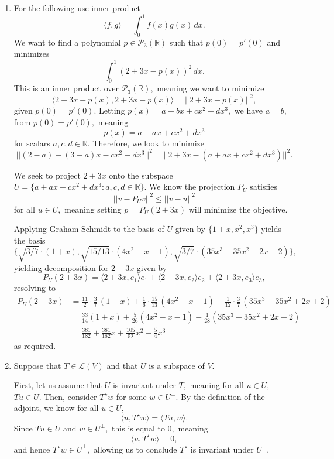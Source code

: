 \documentclass[12pt]{article}
\begin{document}
\begin{enumerate}
  \item For the following use inner product $$\langle f, g \rangle =
    \int_{0}^1 f(x) g(x) \, dx.$$ We want to find a polynomial $p \in
    \mathcal P_3(\mathbb R)$ such that $p(0) = p'(0)$ and minimizes
    $$
    \int_{0}^{1} (2 + 3x - p(x))^2 \, dx.
    $$
    This is an inner product over $\mathcal P_3(\mathbb R),$ meaning
    we want to minimize $$
    \langle 2 + 3x - p(x), 2 + 3x - p(x) \rangle = ||2 + 3x - p(x)||^2,
    $$
    given $p(0) = p'(0).$ Letting $p(x) = a+bx + cx^2 + dx^3,$ we
    have $a = b,$ from $p(0) =p'(0),$ meaning $$
    p(x) = a + ax + cx^2 + dx^3
    $$
    for scalars $a, c, d\in \mathbb R.$ Therefore, we look to minimize
    $$
    ||(2 - a) + (3 - a)x - cx^2 - dx^3||^2 = ||2 + 3x  - (a + ax +
    cx^2 + dx^3)||^2.
    $$

    We seek to project $2 + 3x$ onto the subspace $U = \{a + ax +
    cx^2 + dx^3 : a, c, d \in \mathbb R\}.$ We know the projection
    $P_U$ satisfies
    $$
    ||v - P_U v||^2 \leq  ||v - u||^2
    $$
    for all $u \in U,$ meaning setting $p = P_U (2 + 3x)$  will
    minimize the objective.

    Applying Graham-Schmidt to the basis of $U$ given by $\{1 + x,
    x^2, x^3\}$ yields the basis
    $$
    \{ \sqrt{3/7} \cdot (1 + x), \sqrt{15/13} \cdot (4x^2 - x  - 1),
    \sqrt{3/7} \cdot (35x^3 -35 x^2 + 2x + 2)\},
    $$
    yielding decomposition for $2 + 3x$ given by $$
    P_U(2+3x) = \langle 2+ 3x, e_1 \rangle e_1 + \langle 2 + 3x,
    e_2\rangle e_2 + \langle 2 +3x, e_3\rangle e_3,
    $$
    resolving to
    $$
    \begin{aligned}
      P_U(2+3x) &= \frac{11}{2}\cdot\frac{3}{7}\,(1+x) +
      \frac{1}{6}\cdot\frac{15}{13}\,(4x^2 - x - 1) -
      \frac{1}{12}\cdot\frac{3}{7}\,(35x^3 - 35x^2 + 2x + 2) \\
      &= \frac{33}{14}(1+x) + \frac{5}{26}(4x^2 - x - 1) -
      \frac{1}{28}(35x^3 - 35x^2 + 2x + 2) \\
      &= \frac{381}{182} + \frac{381}{182}x + \frac{105}{52}x^2 - \frac{5}{4}x^3
    \end{aligned}
    $$
    as required.

  \item Suppose that $T \in \mathcal L(V)$ and that $U$ is a subspace of $V.$

    First, let us assume that $U$ is invariant under $T,$ meaning for
    all $u \in U,$ $Tu \in U.$ Then, consider $T^\star w$ for some $w
    \in U^{\perp}.$ By the definition of the adjoint, we know for all $u \in U,$
    $$
    \langle u, T^\star w\rangle = \langle Tu, w \rangle.
    $$
    Since $Tu \in U$ and $w \in U^{\perp},$ this is equal to $0,$ meaning
    $$
    \langle u, T^\star w\rangle = 0,
    $$
    and hence $T^\star w \in U^\perp,$ allowing us to conclude
    $T^\star$ is invariant under $U^\perp.$


\end{enumerate}
\end{document}
